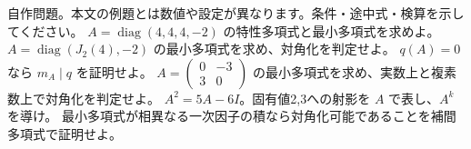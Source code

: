 \documentclass[11pt]{article}
\begin{document}
自作問題。本文の例題とは数値や設定が異なります。条件・途中式・検算を示してください。
\problem[最小と特性の違い]
$A=\operatorname{diag}(4,4,4,-2)$ の特性多項式と最小多項式を求めよ。
\workspace{45mm}
\problem[非自明なブロック]
$A=\operatorname{diag}(J_2(4),-2)$ の最小多項式を求め、対角化を判定せよ。
\workspace{45mm}
\newpage
\problem[整除性の証明]
$q(A)=0$ なら $m_A\mid q$ を証明せよ。
\workspace{45mm}
\problem[体の条件]
$A=\begin{pmatrix}0&-3\\3&0\end{pmatrix}$ の最小多項式を求め、実数上と複素数上で対角化を判定せよ。
\workspace{45mm}
\newpage
\problem[スペクトル射影]
$A^2=5A-6I$。固有値2,3への射影を $A$ で表し、$A^k$ を導け。
\workspace{45mm}
\problem[十分性の証明]
最小多項式が相異なる一次因子の積なら対角化可能であることを補間多項式で証明せよ。
\workspace{45mm}
\end{document}
